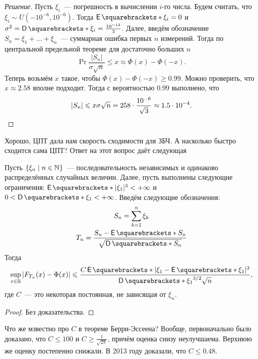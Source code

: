 \begin{proof}[Решение]
	Пусть \(\xi_{i}\)~--- погрешность в вычислении \(i\)-го числа. Будем считать, что \(\xi_{i} \sim U(-10^{-6}, 10^{-6})\). Тогда \(\E{\xi_{i}} = 0\) и \(\sigma^2 = \D{\xi_{i}} = \frac{10^{-12}}{3}\). Далее, введём обозначение \(S_n = \xi_{1} + \dots + \xi_{n}\)~--- суммарная ошибка первых \(n\) измерений. Тогда по центральной предельной теореме для достаточно больших \(n\)
	\[
		\Pr{\frac{|S_n|}{\sigma\sqrt{n}} \leq x} \approx \Phi(x) - \Phi(-x).
	\]
	Теперь возьмём \(x\) такое, чтобы \(\Phi(x) - \Phi(-x) \geq 0.99\). Можно проверить, что \(x \approx 2.58\) вполне подходит. Тогда с вероятностью \(0.99\) выполнено, что
	\[
		|S_n| \leq x\sigma\sqrt{n} = 258 \cdot \frac{10^{-6}}{\sqrt{3}} \approx 1.5 \cdot 10^{-4}.\qedhere
	\]
\end{proof}

Хорошо, ЦПТ дала нам скорость сходимости для ЗБЧ. А насколько быстро сходится сама ЦПТ? Ответ на этот вопрос даёт следующая 
\begin{theorem}
	Пусть \(\{\xi_{n} \mid n \in \N\}\)~--- последовательность независимых и одинаково распределённых случайных величин. Далее, пусть выполнены следующие ограничения: \(\E{|\xi_1|^3} < +\infty\) и \(0 < \D{\xi_1} < +\infty\). Введём следующие обозначения:
	\begin{gather*}
		S_n = \sum_{k = 1}^{n} \xi_{k} \\
		T_n = \frac{S_n - \E{S_n}}{\sqrt{\D{S_n}}}
	\end{gather*}
	Тогда
	\[
		\sup_{x \in \R} \left|F_{T_n}(x) - \Phi(x)\right| \leq 
		\frac{C\E{|\xi_1 - \E{\xi_1}|^3}}{\D{\xi_{1}}^{3/2}\sqrt{n}},
	\]
	где \(C\)~--- это некоторая постоянная, не зависящая от \(\xi_{n}\).
\end{theorem}
\begin{proof}
	Без доказательства.
\end{proof}
Что же мзвестно про \(C\) в теореме Берри-Эссеена? Вообще, первоначально было доказано, что \(C \leq 100\) и \(C \geq \frac{1}{\sqrt{2\pi}}\), причём оценка снизу неулучшаема. Верхнюю же оценку постепенно снижали. В 2013 году доказали, что \(C \leq 0.48\).


